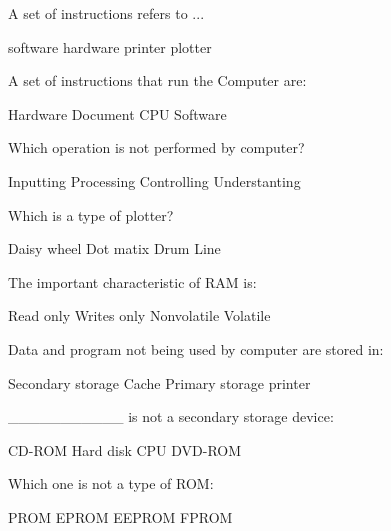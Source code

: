 \documentclass{exam}
\begin{document}
\begin{questions}
A set of instructions refers to ...\\
\begin{oneparchoices}
\choice software
\choice hardware
\choice printer
\choice plotter
\end{oneparchoices}
\question 

A set of instructions that run the Computer are:\\
\begin{oneparchoices}
\choice Hardware
\choice Document
\choice CPU
\choice Software
\end{oneparchoices}
\question 

Which operation is not performed by computer?\\
\begin{oneparchoices}
\choice Inputting
\choice Processing
\choice Controlling
\choice Understanting
\end{oneparchoices}
\question 

Which is a type of plotter?\\
\begin{oneparchoices}
\choice Daisy wheel
\choice Dot matix
\choice Drum
\choice Line
\end{oneparchoices}
\question 

The important characteristic of RAM is:\\
\begin{oneparchoices}
\choice Read only
\choice Writes only
\choice Nonvolatile
\choice Volatile
\end{oneparchoices}
\question 

Data and program not being used by computer are stored in:\\
\begin{oneparchoices}
\choice Secondary storage
\choice Cache
\choice Primary storage
\choice printer
\end{oneparchoices}
\question 

\_\_\_\_\_\_\_\_\_\_\_ is not a secondary storage device:\\
\begin{oneparchoices}
\choice CD-ROM
\choice Hard disk
\choice CPU
\choice DVD-ROM
\end{oneparchoices}
\question 

Which one is not a type of ROM:\\
\begin{oneparchoices}
\choice PROM
\choice EPROM
\choice EEPROM
\choice FPROM
\end{oneparchoices}
\question 


\end{questions}
\end{document}

